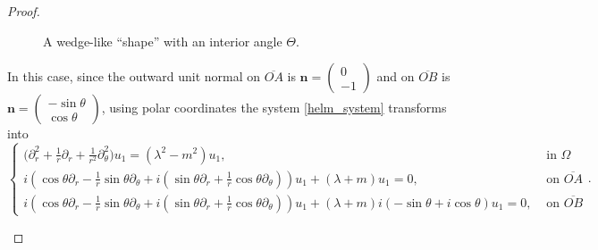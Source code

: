 \begin{proof}
\begin{enumerate}
\begin{figure}[H]
    \caption{A wedge-like ``shape'' with an interior angle \(\Theta\).}
    \label{wedge_dirac}
    \end{figure}
    In this case, since the outward unit normal on \(\overline{OA}\) is \(\mathbf{n} =\begin{pmatrix}
        0\\
        -1
    \end{pmatrix}\) and on \(\overline{OB}\) is \(\mathbf{n} =\begin{pmatrix}
        -\sin \theta\\
        \cos \theta
    \end{pmatrix}\), using polar coordinates the system \eqref{helm_system} transforms into
    \begin{equation}\label{helm_polar_wedge}
        \begin{cases}
            \Big(\partial_r^2 + \frac{1}{r}\partial_r +\frac{1}{r^2}\partial_\theta^2 \Big)u_1 = (\lambda^2 - m^2)u_1, & \text{ in } \Omega\\
             i (\cos \theta\partial_r -\frac{1}{r}\sin \theta \partial_\theta + i(\sin \theta\partial_r +\frac{1}{r}\cos \theta \partial_\theta))u_1 + (\lambda + m)u_1 = 0, & \text{ on } \overline{OA}\\
             i (\cos \theta\partial_r -\frac{1}{r}\sin \theta \partial_\theta + i(\sin \theta\partial_r +\frac{1}{r}\cos \theta \partial_\theta))u_1 + (\lambda + m)i(-\sin \theta + i \cos \theta)u_1 = 0, & \text{ on } \overline{OB}
        \end{cases}.      
    \end{equation}


\end{enumerate}
\end{proof}
